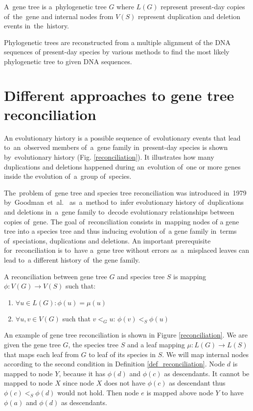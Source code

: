 A~gene tree is a~phylogenetic tree $G$ where $L(G)$ represent present-day copies of~the~gene and internal nodes from $V(S)$ represent duplication and deletion events in~the~history.

Phylogenetic trees are reconstructed from a multiple alignment of the DNA sequences of present-day species by various methods \cite{felsenstein} to find  the most likely phylogenetic tree to given DNA sequences.

\section{Different approaches to gene tree reconciliation}
An evolutionary history is a possible sequence of~evolutionary events that lead to~an~observed members of~a~gene family in~present-day species is shown by~evolutionary history (Fig. \ref{reconciliation}). It illustrates how many duplications and deletions happened during an~evolution of~one or more genes inside the evolution of~a~group of~species.

The~problem of~gene tree and species tree reconciliation was introduced in~1979 by~Goodman~et~al.~\cite{goodman} as~a~method to~infer evolutionary history of~duplications and deletions in~a~gene family to~decode evolutionary relationships between copies of~gene. The goal of~reconciliation consists in~mapping nodes of a gene tree into a species tree and thus inducing evolution of~a gene family in~terms of~speciations, duplications and deletions. An important prerequisite for~reconciliation is to~have a~gene tree without errors as~a~misplaced leaves can lead to~a different history of~the gene family.

\begin{definition}
A reconciliation between gene tree $G$ and species tree $S$ is mapping $\phi: V(G) \rightarrow V(S)$ such that:
	\begin{enumerate}\itemsep0em
	\item $\forall u \in L(G): \phi(u) = \mu(u)$
	\item $\forall u, v \in V(G)$ such that $v<_Gu$: $\phi(v)<_S\phi(u)$
	\end{enumerate}
	\label{def_reconciliation}
\end{definition}

An example of gene tree reconciliation is shown in Figure \ref{reconciliation}. We are given the gene tree $G$, the species tree $S$ and a leaf mapping $\mu: L(G) \rightarrow L(S)$ that maps each leaf from $G$ to leaf of its species in $S$. We will map internal nodes according to the second condition in Definition \ref{def_reconciliation}. Node $d$ is mapped to node $Y$, because it has $\phi(d)$ and $\phi(c)$ as descendants. It cannot be mapped to node $X$ since node $X$ does not have $\phi(c)$ as descendant thus $\phi(c)<_S\phi(d)$ would not hold. Then node $e$ is mapped above node $Y$ to have $\phi(a)$ and $\phi(d)$ as descendants. 

